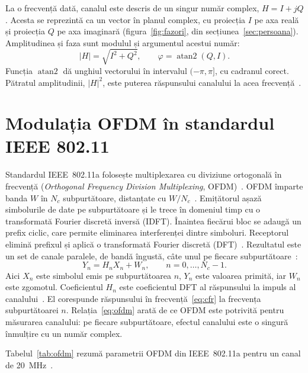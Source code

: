 La o frecvență dată, canalul este descris de un singur număr complex, $H = I + jQ$.
Acesta se reprezintă ca un vector în planul complex, cu proiecția $I$ pe axa reală și proiecția $Q$ pe axa imaginară (figura~\ref{fig:fazori}, din secțiunea~\ref{sec:persoana}).
Amplitudinea și faza sunt modulul și argumentul acestui număr:
\begin{equation}\label{eq:amp_faza}
	|H| = \sqrt{I^2 + Q^2}, \qquad \varphi = \operatorname{atan2}(Q, I).
\end{equation}
Funcția $\operatorname{atan2}$ dă unghiul vectorului în intervalul $(-\pi, \pi]$, cu cadranul corect.
Pătratul amplitudinii, $|H|^2$, este puterea răspunsului canalului la acea frecvență~\cite[Sec.~3.4]{wang2015carm}.

\section{Modulația OFDM în standardul IEEE 802.11}\label{sec:ofdm}

Standardul IEEE~802.11a folosește multiplexarea cu diviziune ortogonală în frecvență (\emph{Orthogonal Frequency Division Multiplexing}, OFDM)~\cite{ieee80211a}.
OFDM împarte banda $W$ în $N_c$ subpurtătoare, distanțate cu $W/N_c$~\cite[Sec.~3.4.4]{tse2005}.
Emițătorul așază simbolurile de date pe subpurtătoare și le trece în domeniul timp cu o transformată Fourier discretă inversă (IDFT).
Înaintea fiecărui bloc se adaugă un prefix ciclic, care permite eliminarea interferenței dintre simboluri.
Receptorul elimină prefixul și aplică o transformată Fourier discretă (DFT)~\cite[Sec.~3.4.4]{tse2005}.
Rezultatul este un set de canale paralele, de bandă îngustă, câte unul pe fiecare subpurtătoare~\cite[ec.~(3.145)]{tse2005}:
\begin{equation}\label{eq:ofdm}
	Y_n = H_n X_n + W_n, \qquad n = 0, \ldots, N_c - 1.
\end{equation}
Aici $X_n$ este simbolul emis pe subpurtătoarea $n$, $Y_n$ este valoarea primită, iar $W_n$ este zgomotul.
Coeficientul $H_n$ este coeficientul DFT al răspunsului la impuls al canalului~\cite[Sec.~3.4.4]{tse2005}.
El corespunde răspunsului în frecvență~\eqref{eq:cfr} la frecvența subpurtătoarei $n$.
Relația~\eqref{eq:ofdm} arată de ce OFDM este potrivită pentru măsurarea canalului: pe fiecare subpurtătoare, efectul canalului este o singură înmulțire cu un număr complex.

Tabelul~\ref{tab:ofdm} rezumă parametrii OFDM din IEEE~802.11a pentru un canal de 20~MHz~\cite[Tab.~79]{ieee80211a}.

